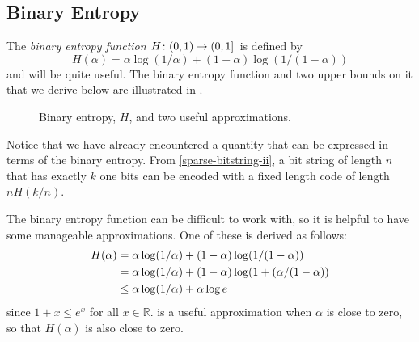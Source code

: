 \documentclass{patmorin}
\begin{document}
\subsection{Binary Entropy}

The \emph{binary entropy function} $H\colon (0,1)\to(0,1]$ is defined by
\[
    H(\alpha) = \alpha\log(1/\alpha) + (1-\alpha)\log(1/(1-\alpha)) 
\]
and will be quite useful.  The binary entropy function and two upper
bounds on it that we derive below are illustrated in .

\begin{figure}
  \caption{Binary entropy, $H$, and two useful approximations.}
\end{figure}

Notice that we have already encountered a quantity that can be
expressed in terms of the binary entropy.  From
\eqref{sparse-bitstring-ii}, a bit string of length $n$ that has
exactly $k$ one bits can be encoded with a fixed length code of length
$nH(k/n)$.

The binary entropy function can be difficult to work with, so it is
helpful to have some manageable approximations.  One of these is derived
as follows:
\begin{align}
  H(\alpha) & = \alpha\log(1/\alpha) + (1-\alpha)\log(1/(1-\alpha)) \notag \\
       & = \alpha\log(1/\alpha) + (1-\alpha)\log(1+(\alpha/(1-\alpha)) \notag \\
       & \le \alpha\log(1/\alpha) + \alpha\log e \eqlabel{entropy-i} 
\end{align}
since $1+x\le e^x$ for all $x\in\mathbb{R}$.  is a
useful approximation when $\alpha$ is close to zero, so that $H(\alpha)$ is also
close to zero.
\end{document}
